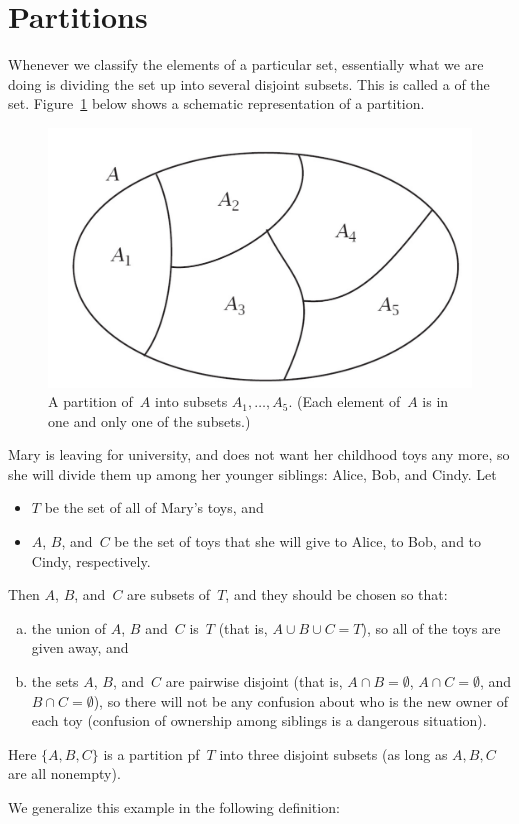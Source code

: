 \section{Partitions}  \label{EquivalenceRelationsPartitionsSect}

Whenever we classify the elements of a particular set, essentially what we are doing is dividing the set up into several disjoint subsets. This is called a   of the set. Figure~\ref{partitionfig} below shows a schematic representation of a partition.

\begin{center}
\begin{figure}[ht]
\label{partitionfig}
\includegraphics[scale=0.35]{images/partition.pdf}
\caption{A partition of~$A$ into subsets $A_1, \ldots, A_5$. 
(Each element of~$A$ is in one and only one of the subsets.)}
\end{figure}
\end{center}


\begin{eg} \label{ToyPartitionEg}
Mary is leaving for university, and does not want her childhood toys any more, so she will divide them up among her younger siblings: Alice, Bob, and Cindy. Let 
\begin{itemize}
\item $T$ be the set of all of Mary's toys, 
and
\item $A$, $B$, and~$C$ be the set of toys that she will give to Alice, to Bob, and to Cindy, respectively.
\end{itemize}
Then $A$, $B$, and~$C$ are subsets of~$T$, and they should be chosen so that:
\begin{enumerate}[(a)]
\item the union of $A$, $B$ and~$C$ is~$T$ (that is, $A \cup B \cup C = T$), so all of the toys are given away,
and
\item the sets $A$, $B$, and~$C$ are pairwise disjoint (that is, $A \cap B = \emptyset$, $A \cap C = \emptyset$, and $B \cap C = \emptyset$), so there will not be any confusion about who is the new owner of each toy (confusion of ownership among siblings is a dangerous situation).
\end{enumerate}
Here $\{A, B, C\}$ is a  partition pf~$T$ into three disjoint subsets (as long as $A, B, C$ are all nonempty). 
\end{eg}
We generalize this example in the following definition:

